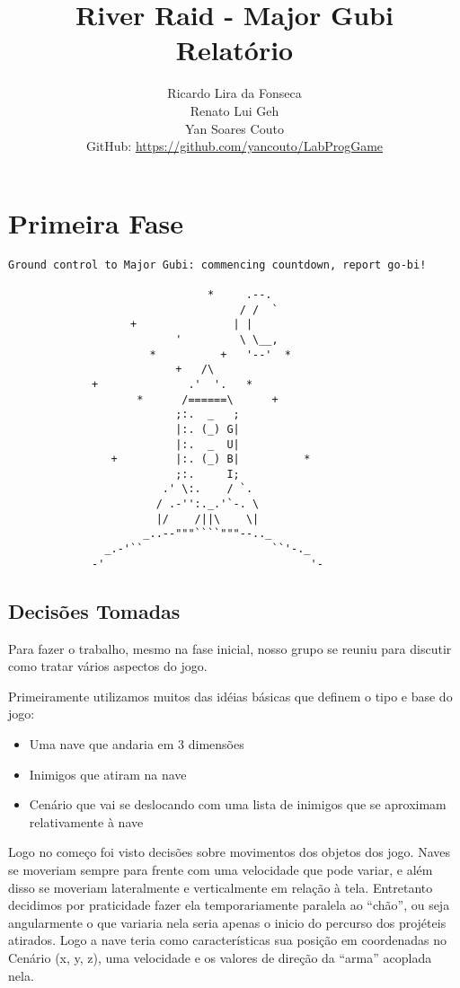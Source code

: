 \documentclass[12pt,a4paper]{article}
\title{\vspace{-130pt}
River Raid - Major Gubi \\
		Relatório}
\author{Ricardo Lira da Fonseca\\Renato Lui Geh\\Yan Soares Couto\\GitHub: \url{https://github.com/yancouto/LabProgGame}}
\date{}
\begin{document}
	\maketitle
	\section{Primeira Fase}
	\begin{verbatim}
Ground control to Major Gubi: commencing countdown, report go-bi!

                               *     .--.
                                    / /  `
                   +               | |
                          '         \ \__,
                      *          +   '--'  *
                          +   /\
             +              .'  '.   *
                    *      /======\      +
                          ;:.  _   ;
                          |:. (_) G|
                          |:.  _  U|
                +         |:. (_) B|          *
                          ;:.     I;
                        .' \:.    / `.
                       / .-'':._.'`-. \
                       |/    /||\    \|
                     _..--"""````"""--.._
               _.-'``                    ``'-._
             -'                                '-
	\end{verbatim}
		\subsection{Decisões Tomadas}
		Para fazer o trabalho, mesmo na fase inicial, nosso grupo se reuniu para discutir como tratar vários 					aspectos do jogo.
	
	  	Primeiramente utilizamos muitos das idéias básicas que definem o tipo e base do jogo:
	  	\begin{itemize}
	  		\item Uma nave que andaria em 3 dimensões
	  		\item Inimigos que atiram na nave
	  		\item Cenário que vai se deslocando com uma lista de inimigos que se aproximam relativamente à nave
	  	\end{itemize}
	  	Logo no começo foi visto decisões sobre movimentos dos objetos dos jogo. Naves se moveriam
		sempre para frente com uma velocidade que pode variar, e além disso se moveriam lateralmente
		e verticalmente em relação à tela. Entretanto decidimos por praticidade fazer ela temporariamente
		paralela ao ``chão'', ou seja angularmente o que variaria nela seria apenas o inicio do percurso
		dos projéteis atirados. Logo a nave teria como características sua posição em coordenadas no
		Cenário (x, y, z), uma velocidade e os valores de direção da ``arma'' acoplada nela.\\
		
\end{document}
